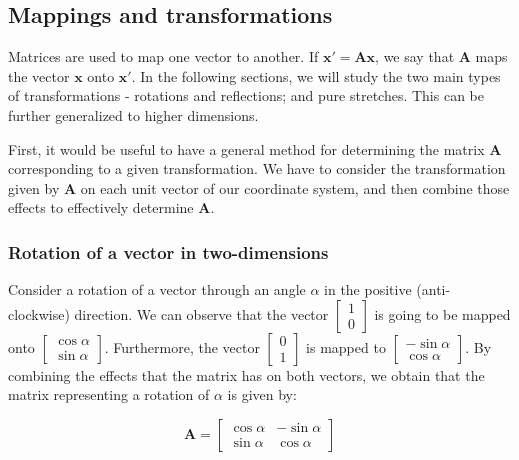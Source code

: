 \documentclass[12pt]{article}
\begin{document}
\newpage

\subsection{Mappings and transformations}

Matrices are used to map one vector to another. If $\mathbf{x}' = \mathbf{Ax}$, we say that $\mathbf{A}$ maps the vector $\mathbf{x}$ onto $\mathbf{x}'$. In the following sections, we will study the two main types of transformations - rotations and reflections; and pure stretches. This can be further generalized to higher dimensions.

First, it would be useful to have a general method for determining the matrix $\mathbf{A}$ corresponding to a given transformation. We have to consider the transformation given by $\mathbf{A}$ on each unit vector of our coordinate system, and then combine those effects to effectively determine $\mathbf{A}$.

\subsubsection{Rotation of a vector in two-dimensions}

Consider a rotation of a vector through an angle $\alpha$ in the positive (anti-clockwise) direction. We can observe that the vector $\begin{bmatrix}
    1 \\
    0
\end{bmatrix}$ is going to be mapped onto $\begin{bmatrix}
    \cos{\alpha} \\
    \sin{\alpha}
\end{bmatrix}$. Furthermore, the vector $\begin{bmatrix}
    0 \\
    1
\end{bmatrix}$ is mapped to $\begin{bmatrix}
    -\sin{\alpha} \\
    \cos{\alpha}
\end{bmatrix}$. By combining the effects that the matrix has on both vectors, we obtain that the matrix representing a rotation of $\alpha$ is given by:

\[ \mathbf{A} = \begin{bmatrix}
    \cos{\alpha} & -\sin{\alpha} \\
    \sin{\alpha} & \cos{\alpha}
\end{bmatrix} \]
\end{document}
